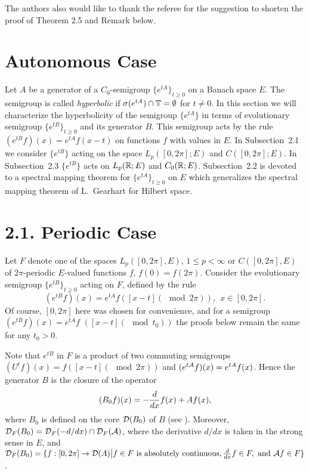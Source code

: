 The authors also would like to thank the referee for
the suggestion to shorten the proof of Theorem 2.5 and Remark below.

\section{Autonomous Case}

Let $A$ be a generator of a $C_0$-semigroup $\{e^{tA}\}_{t\geq 0}$ on a
Banach space $E$.  The semigroup is called {\it hyperbolic} if $\sigma
(e^{tA}) \cap {\Bbb{T}} =\emptyset$ for $t\neq 0$.  In this section we will
characterize the hyperbolicity of the semigroup $\{e^{tA}\}$ in terms
of evolutionary semigroup $\{e^{tB}\}_{t \geq 0}$ and its generator
$B$.  This semigroup acts by the rule $(e^{tB} f)(x) =e^{tA} f(x-t)$ on
functions $f$ with values in $E$.  In Subsection~2.1 we consider
$\{e^{tB}\}$ acting on the space $L_p ([ 0, 2\pi]; E)$ and $C([0,2\pi];E)$.
In Subsection~2.3 $\{e^{tB}\}$ acts on $L_p ({\Bbb{R}};E)$ and
$C_0({\Bbb{R}};E)$.  Subsection~2.2 is devoted to a spectral mapping
theorem for $\{e^{tA}\}_{t\geq 0}$ on $E$ which generalizes the spectral
mapping theorem of L.~Gearhart for Hilbert space.

\section*{2.1. Periodic Case}

Let $F$ denote one of the spaces
$L_p ([0,2\pi],E)$, $1\leq p < \infty$
or  $C([0,2\pi],E)$
of $2\pi$-periodic $E$-valued functions $f$, $f(0)=f(2\pi)$.
Consider the evolutionary semigroup
$\{e^{tB}\}_{t\geq 0}$ acting on $F$, defined by the rule
$$
(e^{tB} f) (x) =e^{tA}
f([x-t] (\mod 2\pi)),~~x\in [0,2\pi].
$$
Of course,
$[0,2\pi]$ here was chosen for convenience, and for a semigroup $(e^{tB}
f)(x) =e^{tA} f$ $([x-t] (\mod t_0))$
the proofs below remain the same for any
$t_0 > 0$.

Note that $e^{tB}$ in $F$ is a product of two commuting
semigroups $(U^t f) (x) =f([x-t] (\mod 2\pi))$ and $(e^{t{\cal A}}f)(x)
=e^{tA}f(x)$.  Hence
the generator $B$ is the closure of the operator
\begin{equation}
(B_0f)(x) =-\dfrac{d}{dx} f(x) +Af(x),
\lb{genB}
\end{equation}
where $B_0$ is defined on the core ${\cal{D}} (B_0)$ of $B$ (see
\cite[p.~24]{21}).  Moreover, ${\cal{D}}_F(B_0) ={\cal{D}}_F (-d/ dx) \cap
{\cal{D}}_F ({\cal A})$, where the derivative $d/dx$ is taken in the strong sense in
$E$, and ${\cal{D}}_F (B_0)=\{f: [0,2\pi] \to {\cal{D}} (A) \big| f\in F \mbox{ is
absolutely continuous}, \frac{d}{dx} f \in F,
\mbox{ and } {\cal A}f\in F\}$.

